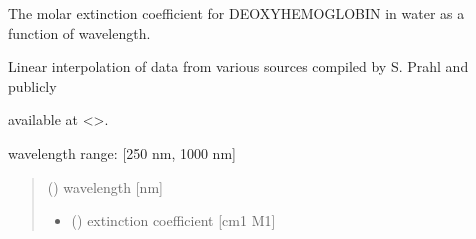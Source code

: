 \documentclass[letterpaper,10pt,english]{sphinxmanual}
\begin{document}

\begin{fulllineitems}
\label{\detokenize{03_absorption_coefficient:skinoptics.absorption_coefficient.molarext_deo_Prahl}}
\pysigstartsignatures
{}
\pysigstopsignatures
\begin{DUlineblock}{0em}
\item[] The molar extinction coefficient for DEOXY\sphinxhyphen{}HEMOGLOBIN in water as a function of wavelength.
\item[] Linear interpolation of data from various sources compiled by S. Prahl and publicly
\item[] available at \textless{}\textgreater{}.
\end{DUlineblock}

\begin{DUlineblock}{0em}
\item[] wavelength range: {[}250 nm, 1000 nm{]}
\end{DUlineblock}
\begin{quote}\begin{description}
\sphinxAtStartPar
{} () \textendash{} wavelength {[}nm{]}

\sphinxAtStartPar
\begin{itemize}
\item {} 
\sphinxAtStartPar
{} () \textendash{} extinction coefficient {[}cm\sphinxhyphen{}1 M\sphinxhyphen{}1{]}

\end{itemize}


\end{description}\end{quote}

\end{fulllineitems}

\end{document}

